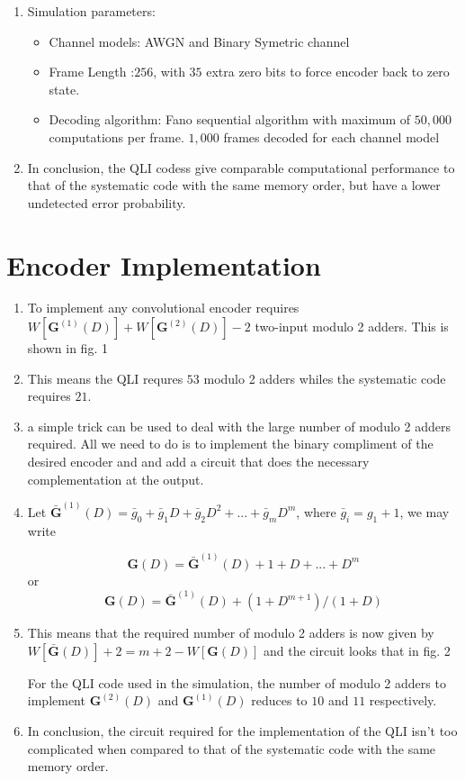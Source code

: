 \documentclass[fontsize=12pt]{article}
\begin{document}
\begin{enumerate}
\item Simulation parameters: 

\begin{itemize}
\item Channel models: AWGN and Binary Symetric channel

\item Frame Length :$256$, with $35$ extra zero bits to force encoder back to zero state.

\item Decoding algorithm: Fano sequential algorithm with maximum of $50,000$ computations per frame. $1,000$ frames decoded for each channel model

\end{itemize}

\item In conclusion, the QLI codess give comparable computational performance to that of the systematic code with the same memory order, but have a lower undetected error probability.
\end{enumerate}

\section{Encoder Implementation}
\begin{enumerate}
\item To implement any convolutional encoder requires $W[\mathbf{G}^{(1)}(D)]+W[\mathbf{G}^{(2)}(D)] -2 $ two-input modulo 2 adders. This is shown in fig. 1

\item This means the QLI requres $53$ modulo 2 adders whiles the systematic code requires $21$.

\item a simple trick can be used to deal with the large number of modulo 2 adders required. All we need to do is to implement the binary compliment of the desired encoder and and add a circuit that does the necessary complementation at the output.

\item Let $\bar{\mathbf{G}}^{(1)}(D)=\bar{g}_0 + \bar{g}_1D+\bar{g}_2D^2+...+\bar{g}_mD^m$, where $\bar{g}_i  = g_1 +1$, we may write 

$$ \mathbf{G}(D) =\bar{\mathbf{G}}^{(1)}(D)+ 1+D+...+D^m $$
or 
$$ \mathbf{G}(D) =\bar{\mathbf{G}}^{(1)}(D)+( 1+D^{m+1})/(1+D) $$

\item This means that the required number of modulo 2 adders is now given by $W[\bar{\mathbf{G}}(D)]+2 =m+2-W[\mathbf{G}(D)] $ and the circuit looks that in fig. 2

For the QLI code used in the simulation, the number of modulo 2 adders to implement $\mathbf{G}^{(2)}(D)$ and $\mathbf{G}^{(1)}(D)$ reduces to $10$ and $11$ respectively.  

\item In conclusion, the circuit required for the implementation of the QLI isn't too complicated when compared to that of the systematic code with the same memory order.
\end{enumerate}
\end{document}
